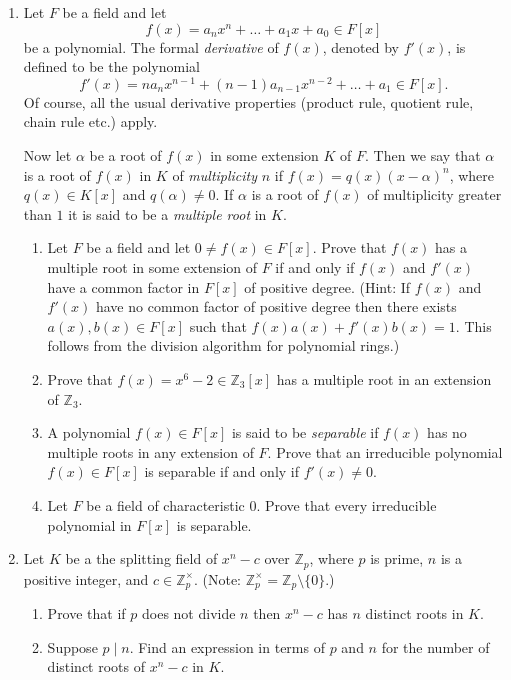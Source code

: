 \documentclass[notoc,notitlepage,nobib]{tufte-book}
\begin{document}
\begin{enumerate}
\begin{enumerate}
    \end{enumerate}
  \item Let $F$ be a field and let
    \begin{equation*}
      f(x) = a_n x^n + \hdots + a_1 x + a_0 \in F[x]
    \end{equation*}
    be a polynomial. The formal \textit{derivative} of $f(x)$, denoted by
    $f'(x)$, is defined to be the polynomial
    \begin{equation*}
      f'(x) = na_n x^{n - 1} + (n - 1) a_{n - 1} x^{n - 2} + \hdots + a_1 \in
      F[x].
    \end{equation*}
    Of course, all the usual derivative properties (product rule, quotient rule,
    chain rule etc.) apply.

    Now let $\alpha$ be a root of $f(x)$ in some extension $K$ of $F$. Then we
    say that $\alpha$ is a root of $f(x)$ in $K$ of \textit{multiplicity} $n$ if
    $f(x) = q(x)(x - \alpha)^n$, where $q(x) \in K[x]$ and $q(\alpha) \neq 0$.
    If $\alpha$ is a root of $f(x)$ of multiplicity greater than $1$ it is said
    to be a \textit{multiple root} in $K$.
    \begin{enumerate}
      \item Let $F$ be a field and let $0 \neq f(x) \in F[x]$. Prove that $f(x)$
        has a multiple root in some extension of $F$ if and only if $f(x)$ and
        $f'(x)$ have a common factor in $F[x]$ of positive degree. (Hint: If
        $f(x)$ and $f'(x)$ have no common factor of positive degree then there
        exists $a(x), b(x) \in F[x]$ such that $f(x) a(x) + f'(x) b(x) = 1$.
        This follows from the division algorithm for polynomial rings.)
      \item Prove that $f(x) = x^6 - 2 \in \mathbb{Z}_3[x]$ has a multiple root
        in an extension of $\mathbb{Z}_3$.
      \item A polynomial $f(x) \in F[x]$ is said to be \textit{separable} if
        $f(x)$ has no multiple roots in any extension of $F$. Prove that an
        irreducible polynomial $f(x) \in F[x]$ is separable if and only if
        $f'(x) \neq 0$.
      \item Let $F$ be a field of characteristic $0$. Prove that every
        irreducible polynomial in $F[x]$ is separable.
    \end{enumerate}
  \item Let $K$ be a the splitting field of $x^n - c$ over $\mathbb{Z}_p$, where
    $p$ is prime, $n$ is a positive integer, and $c \in \mathbb{Z}_p^\times$.
    (Note: $\mathbb{Z}_p^\times = \mathbb{Z}_p \setminus \{ 0 \}$.)
    \begin{enumerate}
      \item Prove that if $p$ does not divide $n$ then $x^n - c$ has $n$
        distinct roots in $K$.
      \item Suppose $p \mid n$. Find an expression in terms of $p$ and $n$ for
        the number of distinct roots of $x^n - c$ in $K$.
    \end{enumerate}
\end{enumerate}
\end{document}
